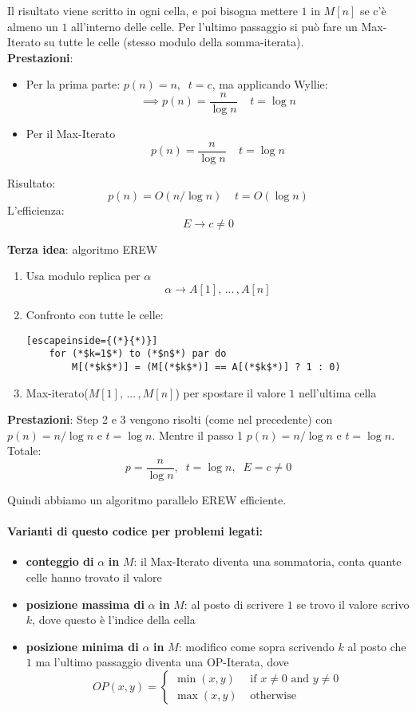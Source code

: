 Il risultato viene scritto in ogni cella, e poi bisogna mettere $1$ in $M[n]$ se c'è almeno un $1$ all'interno delle celle. Per l'ultimo passaggio si può fare un Max-Iterato su tutte le celle (stesso modulo della somma-iterata).\\

\textbf{Prestazioni}: 
\begin{itemize}
	\item Per la prima parte: $p(n) = n, \;\; t = c$, ma applicando Wyllie: 
	$$ \implies p(n) = \frac{n}{\log n} \;\;\;\; t = \log n$$
	\item Per il Max-Iterato 
	$$ p(n) = \frac{n}{\log n} \;\;\;\; t = \log n $$
\end{itemize}
Risultato: 
$$ p(n) = O (n/\log n) \;\;\;\; t = O (\log n) $$
L'efficienza: 
$$ E \rightarrow c \neq 0$$

\newpage

\textbf{Terza idea}: algoritmo EREW
\begin{enumerate}
	\item Usa modulo replica per $\alpha$
	$$ \alpha \rightarrow A[1], \, ... \, , A[n] $$
	\item Confronto con tutte le celle: 
	\begin{lstlisting}[escapeinside={(*}{*)}]
	for (*$k=1$*) to (*$n$*) par do 
		M[(*$k$*)] = (M[(*$k$*)] == A[(*$k$*)] ? 1 : 0)
	\end{lstlisting}
	\item Max-iterato($M[1], \, ... \, , M[n]$) per spostare il valore $1$ nell'ultima cella
\end{enumerate}

\textbf{Prestazioni}: 
Step 2 e 3 vengono risolti (come nel precedente) con $ p(n) = n/\log n$ e $t = \log n$.  Mentre il passo 1 $ p(n) = n/\log n$ e $t = \log n$.\\
Totale: 
$$ p = \frac{n}{\log n}, \;\; t = \log n, \;\; E = c \neq 0 $$

Quindi abbiamo un algoritmo parallelo EREW efficiente.\\

\vfill

\paragraph{Varianti di questo codice per problemi legati:}
\begin{itemize}
	\item \textbf{conteggio di} $\alpha$ \textbf{in} $M$: il Max-Iterato diventa una sommatoria, conta quante celle hanno trovato il valore
	\item \textbf{posizione massima di} $\alpha$ \textbf{in} $M$: al posto di scrivere $1$ se trovo il valore scrivo $k$, dove questo è l'indice della cella 
	\item \textbf{posizione minima di} $\alpha$ \textbf{in} $M$: modifico come sopra scrivendo $k$ al posto che $1$ ma l'ultimo passaggio diventa una OP-Iterata, dove
	$$ OP (x,y) = \begin{cases}
		\min (x,y) & \text{ if } x \neq 0 \text{ and } y \neq 0 \\
		\max (x,y) & \text{ otherwise}
	\end{cases}$$
\end{itemize}


